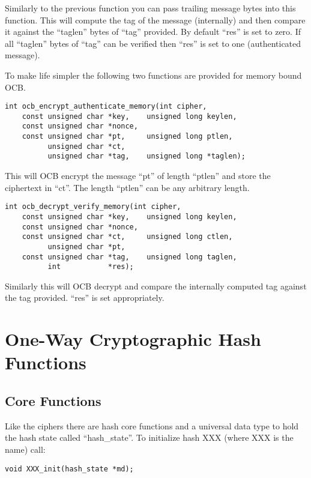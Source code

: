 \documentclass[b5paper]{book}
\begin{document}
Similarly to the previous function you can pass trailing message bytes into this function.  This will compute the 
tag of the message (internally) and then compare it against the ``taglen'' bytes of ``tag'' provided.  By default
``res'' is set to zero.  If all ``taglen'' bytes of ``tag'' can be verified then ``res'' is set to one (authenticated
message).

To make life simpler the following two functions are provided for memory bound OCB.

\begin{verbatim}
int ocb_encrypt_authenticate_memory(int cipher,
    const unsigned char *key,    unsigned long keylen,
    const unsigned char *nonce,  
    const unsigned char *pt,     unsigned long ptlen,
          unsigned char *ct,
          unsigned char *tag,    unsigned long *taglen);
\end{verbatim}

This will OCB encrypt the message ``pt'' of length ``ptlen'' and store the ciphertext in ``ct''.  The length ``ptlen''
can be any arbitrary length.  

\begin{verbatim}
int ocb_decrypt_verify_memory(int cipher,
    const unsigned char *key,    unsigned long keylen,
    const unsigned char *nonce,  
    const unsigned char *ct,     unsigned long ctlen,
          unsigned char *pt,
    const unsigned char *tag,    unsigned long taglen,
          int           *res);
\end{verbatim}

Similarly this will OCB decrypt and compare the internally computed tag against the tag provided. ``res'' is set 
appropriately.



\chapter{One-Way Cryptographic Hash Functions}
\section{Core Functions}

Like the ciphers there are hash core functions and a universal data type to hold the hash state called ``hash\_state''.  
To initialize hash XXX (where XXX is the name) call:
\begin{verbatim}
void XXX_init(hash_state *md);
\end{verbatim}
\end{document}
